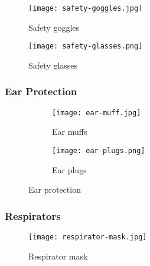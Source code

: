 \documentclass[a4paper,12pt]{article}
\begin{document}
						\begin{figure}[H]
							\centering				
								\texttt{[image: safety-goggles.jpg]}
							
							\caption{Safety goggles}
							\label{fig:safety-goggles}
						\end{figure}
						
						\begin{figure}[H]
							\centering				
								\texttt{[image: safety-glasses.png]}
							
							\caption{Safety glasses}
							\label{fig:safety-glasses}
						\end{figure}
											
					\subsubsection*{Ear Protection}
						\begin{figure}[H]
						\centering
							\begin{subfigure}{0.5\textwidth}
							\centering				
							\texttt{[image: ear-muff.jpg]}
							\caption{Ear muffs}
							\label{subfig:ear-muff}
							\end{subfigure}
							\hfill
							\begin{subfigure}{0.5\textwidth}
							\centering				
							\texttt{[image: ear-plugs.png]}
							\caption{Ear plugs}
							\label{subfig:ear-plugs}
							\end{subfigure}
							\caption{Ear protection}
							\label{fig:ear-protection}
						\end{figure}
						
					\subsubsection*{Respirators}
					
						\begin{figure}[H]
							\centering				
								\texttt{[image: respirator-mask.jpg]}
							\caption{Respirator mask}
							\label{fig:respirator-mask}
						\end{figure}
					\newpage
\end{document}
